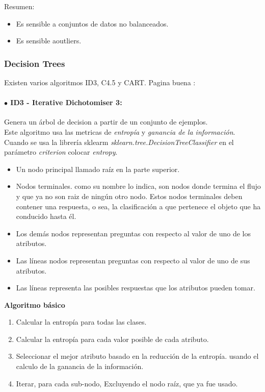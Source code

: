 \documentclass[../main.tex]{subfiles}
\begin{document}
            Resumen:
            \begin{itemize}
                \item Es sensible a conjuntos de datos no balanceados.
                \item Es sensible aoutliers.
            \end{itemize}
    
        \subsubsection{Decision Trees}
            Existen varios algoritmos ID3, C4.5 y CART. Pagina buena \cite{tree_pag}:
        
            \paragraph{$\bullet$ ID3 - Iterative Dichotomiser 3:}
                Genera un árbol de decision a partir de un conjunto de ejemplos.\\
                Este algoritmo usa las metricas de \textit{entropía} y \textit{ganancia de la información}. Cuando se usa la librería sklearm \textit{sklearn.tree.DecisionTreeClassifier} en el parámetro \textit{criterion} colocar \textit{entropy}.
                
                \begin{itemize}
                    \item Un nodo principal llamado raíz en la parte superior.
                    \item Nodos terminales. como su nombre lo indica, son nodos donde termina el flujo y que ya no son raiz de ningún otro nodo. Estos nodos terminales deben contener una respuesta, o sea, la clasificación a que pertenece el objeto que ha conducido hasta él.
                    \item Los demás nodos representan preguntas con respecto al valor de uno de los atributos.
                    \item Las líneas nodos representan preguntas con respecto al valor de uno de sus atributos.
                    \item Las líneas representa las posibles respuestas que los atributos pueden tomar.
                \end{itemize}
        
                \textbf{Algoritmo básico}
                \begin{enumerate}
                    \item Calcular la entropía para todas las clases.
                    \item Calcular la entropía para cada valor posible de cada atributo.
                    \item Seleccionar el mejor atributo basado en la reducción de la entropía. usando el calculo de la ganancia de la información.
                    \item Iterar, para cada sub-nodo, Excluyendo el nodo raíz, que ya fue usado.
                \end{enumerate}
            
\end{document}
